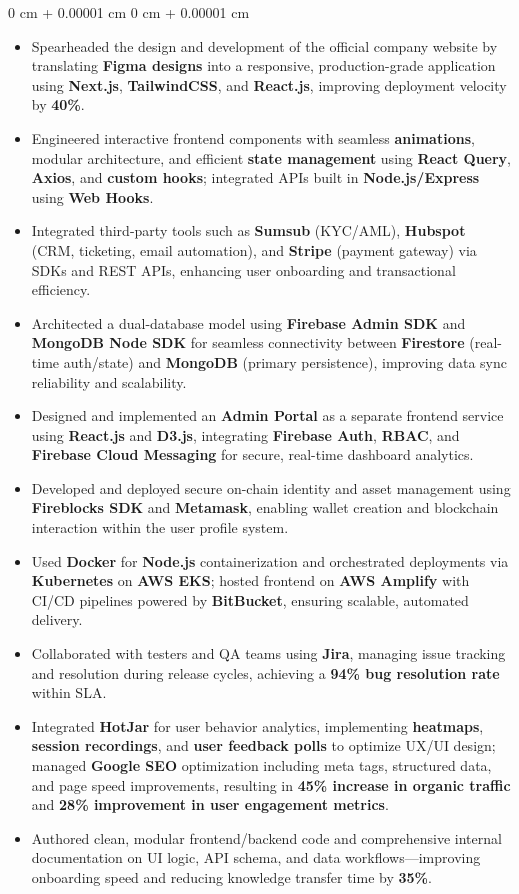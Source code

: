 \documentclass[10pt, letterpaper]{article}
\newenvironment{highlights}{
    \begin{itemize}[
        topsep=0.10 cm,
        parsep=0.10 cm,
        partopsep=0pt,
        itemsep=0pt,
        leftmargin=0 cm + 10pt
    ]
}{
    \end{itemize}
} %
\newenvironment{onecolentry}{
    \begin{adjustwidth}{
        0 cm + 0.00001 cm
    }{
        0 cm + 0.00001 cm
    }
}{
    \end{adjustwidth}
} %
\begin{document}
\begin{onecolentry}
\begin{highlights}
	\item Spearheaded the design and development of the official company website by translating \textbf{Figma designs} into a responsive, production-grade application using \textbf{Next.js}, \textbf{TailwindCSS}, and \textbf{React.js}, improving deployment velocity by \textbf{40\%}.
	\item Engineered interactive frontend components with seamless \textbf{animations}, modular architecture, and efficient \textbf{state management} using \textbf{React Query}, \textbf{Axios}, and \textbf{custom hooks}; integrated APIs built in \textbf{Node.js/Express} using \textbf{Web Hooks}.
	\item Integrated third-party tools such as \textbf{Sumsub} (KYC/AML), \textbf{Hubspot} (CRM, ticketing, email automation), and \textbf{Stripe} (payment gateway) via SDKs and REST APIs, enhancing user onboarding and transactional efficiency.
	\item Architected a dual-database model using \textbf{Firebase Admin SDK} and \textbf{MongoDB Node SDK} for seamless connectivity between \textbf{Firestore} (real-time auth/state) and \textbf{MongoDB} (primary persistence), improving data sync reliability and scalability.
	\item Designed and implemented an \textbf{Admin Portal} as a separate frontend service using \textbf{React.js} and \textbf{D3.js}, integrating \textbf{Firebase Auth}, \textbf{RBAC}, and \textbf{Firebase Cloud Messaging} for secure, real-time dashboard analytics.
	\item Developed and deployed secure on-chain identity and asset management using \textbf{Fireblocks SDK} and \textbf{Metamask}, enabling wallet creation and blockchain interaction within the user profile system.
	\item Used \textbf{Docker} for \textbf{Node.js} containerization and orchestrated deployments via \textbf{Kubernetes} on \textbf{AWS EKS}; hosted frontend on \textbf{AWS Amplify} with CI/CD pipelines powered by \textbf{BitBucket}, ensuring scalable, automated delivery.
	\item Collaborated with testers and QA teams using \textbf{Jira}, managing issue tracking and resolution during release cycles, achieving a \textbf{94\% bug resolution rate} within SLA.
	\item Integrated \textbf{HotJar} for user behavior analytics, implementing \textbf{heatmaps}, \textbf{session recordings}, and \textbf{user feedback polls} to optimize UX/UI design; managed \textbf{Google SEO} optimization including meta tags, structured data, and page speed improvements, resulting in \textbf{45\% increase in organic traffic} and \textbf{28\% improvement in user engagement metrics}.
	\item Authored clean, modular frontend/backend code and comprehensive internal documentation on UI logic, API schema, and data workflows—improving onboarding speed and reducing knowledge transfer time by \textbf{35\%}.
\end{highlights}
\end{onecolentry}
\end{document}
